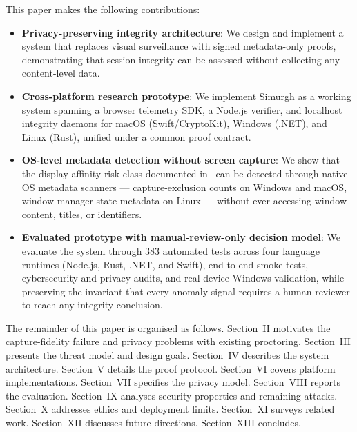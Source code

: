 \documentclass[conference]{IEEEtran}
\begin{document}
This paper makes the following contributions:

\begin{itemize}
\item \textbf{Privacy-preserving integrity architecture}: We design and implement a system that replaces visual surveillance with signed metadata-only proofs, demonstrating that session integrity can be assessed without collecting any content-level data.

\item \textbf{Cross-platform research prototype}: We implement Simurgh as a working system spanning a browser telemetry SDK, a Node.js verifier, and localhost integrity daemons for macOS (Swift/CryptoKit), Windows (.NET), and Linux (Rust), unified under a common proof contract.

\item \textbf{OS-level metadata detection without screen capture}: We show that the display-affinity risk class documented in~\cite{abedini2026invisible} can be detected through native OS metadata scanners — capture-exclusion counts on Windows and macOS, window-manager state metadata on Linux — without ever accessing window content, titles, or identifiers.

\item \textbf{Evaluated prototype with manual-review-only decision model}: We evaluate the system through 383 automated tests across four language runtimes (Node.js, Rust, .NET, and Swift), end-to-end smoke tests, cybersecurity and privacy audits, and real-device Windows validation, while preserving the invariant that every anomaly signal requires a human reviewer to reach any integrity conclusion.
\end{itemize}

The remainder of this paper is organised as follows. Section~II motivates the capture-fidelity failure and privacy problems with existing proctoring. Section~III presents the threat model and design goals. Section~IV describes the system architecture. Section~V details the proof protocol. Section~VI covers platform implementations. Section~VII specifies the privacy model. Section~VIII reports the evaluation. Section~IX analyses security properties and remaining attacks. Section~X addresses ethics and deployment limits. Section~XI surveys related work. Section~XII discusses future directions. Section~XIII concludes.

\end{document}
